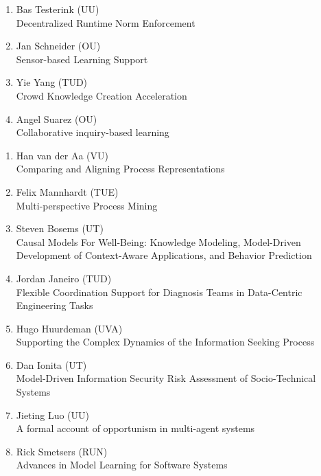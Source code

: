 \begin{multicols}{2}
\begin{scriptsize}
\begin{enumerate}[label=\textbf{2017-\arabic*},leftmargin=0cm,itemindent=1.15cm,labelwidth=\itemindent,labelsep=0cm,align=left,noitemsep]
\item Bas Testerink (UU)     \\
	Decentralized Runtime Norm Enforcement
\item Jan Schneider (OU)     \\
	Sensor-based Learning Support

\item Yie Yang (TUD)    \\
	Crowd Knowledge Creation Acceleration

\item Angel Suarez (OU)     \\
	Collaborative inquiry-based learning 

\end{enumerate}

\begin{enumerate}[label=\textbf{2017-\arabic*},leftmargin=0cm,itemindent=1.15cm,labelwidth=\itemindent,labelsep=0cm,align=left,noitemsep]

\item Han van der Aa (VU)    \\
	Comparing and Aligning Process Representations 
	
\item Felix Mannhardt (TUE)    \\
	Multi-perspective Process Mining
\item Steven Bosems (UT)     \\
	Causal Models For Well-Being: Knowledge Modeling, Model-Driven Development of Context-Aware Applications, and Behavior Prediction 
\item Jordan Janeiro (TUD)    \\
	Flexible Coordination Support for Diagnosis Teams in Data-Centric Engineering Tasks 
\item Hugo Huurdeman (UVA)     \\
	Supporting the Complex Dynamics of the Information Seeking Process 
\item Dan Ionita (UT)    \\
	Model-Driven Information Security Risk Assessment of Socio-Technical Systems
\item Jieting Luo (UU)     \\
	A formal account of opportunism in multi-agent systems 

\item Rick Smetsers (RUN)   \\
	Advances in Model Learning for Software Systems


\end{enumerate}
\end{scriptsize}
\end{multicols}
